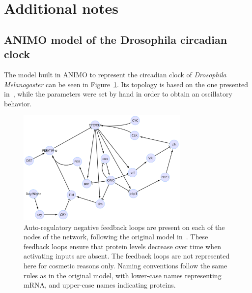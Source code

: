 \documentclass{bmcart}
\begin{document}
\clearpage
\section{Additional notes}

\subsection{ANIMO model of the Drosophila circadian clock}
The model built in ANIMO to represent the circadian clock of \emph{Drosophila Melanogaster}
can be seen in Figure~\ref{fig:drosophila-model}. Its topology is based on the one presented
in~\cite{drosophila-ode-model}, while the parameters were set by hand in order to obtain
an oscillatory behavior.

\def\drosophilaGraphScale{0.069}%
\begin{figure}[!htpb]
\begin{center}
  \includegraphics[width=0.75\textwidth]{Figures/S4}
\end{center}
\caption{
Auto-regulatory negative feedback loops are present on each of the nodes of
the network, following the original model in~\cite{drosophila-ode-model}. These feedback loops ensure that
protein levels decrease over time when activating inputs are absent. The feedback loops are not represented here
for cosmetic reasons only.
Naming conventions follow the same rules
as in the original model, with lower-case names representing mRNA, and upper-case names indicating proteins.
}\label{fig:drosophila-model}
\end{figure}
\end{document}
